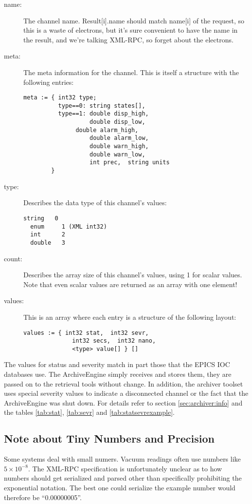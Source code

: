 \begin{description}
\item[\sffamily name:]
   The channel name.
   Result[i].name should match name[i] of the request, 
   so this is a waste of electrons,  but it's sure convenient
   to have the name in the result,  and we're talking XML-RPC,
   so forget about the electrons.
\item[\sffamily meta:]
   The meta information for the channel. This is itself a structure 
   with the following entries:
   \begin{lstlisting}[keywordstyle=\sffamily]
meta := { int32 type;
          type==0: string states[], 
          type==1: double disp_high, 
                   double disp_low, 
	           double alarm_high, 
                   double alarm_low, 
                   double warn_high, 
                   double warn_low, 
                   int prec,  string units
        }
   \end{lstlisting}
\item[\sffamily type:]
   Describes the data type of this channel's values:
  \begin{lstlisting}[frame=none, keywordstyle=\sffamily]
  string   0
  enum	   1 (XML int32)
  int      2
  double   3
  \end{lstlisting}
\item[\sffamily count:]
  Describes the array size of this channel's values,  using 1 for
  scalar values. Note that even scalar values are returned as an array
  with one element!
\item[\sffamily values:]
  This is an array where each entry is a structure of the following
  layout:
  \begin{lstlisting}[frame=none, keywordstyle=\sffamily]
  values := { int32 stat,  int32 sevr,
              int32 secs,  int32 nano,
              <type> value[] } []
  \end{lstlisting}
\end{description}

\noindent The values for status and severity match in part those that
the EPICS IOC databases use. The ArchiveEngine simply receives and
stores them, they are passed on to the retrieval tools without
change. In addition, the archiver toolset uses special severity values
to indicate a disconnected channel or the fact that the ArchiveEngine
was shut down.  For details refer to section \ref{sec:archiver:info}
and the tables \ref{tab:stat}, \ref{tab:sevr} and
\ref{tab:statsevrexample}.

\subsection{Note about Tiny Numbers and Precision} \label{sec:xml:tiny} %
Some systems deal with small numers. Vacuum readings often use numbers
like $5 \times 10^{-8}$. The XML-RPC specification is unfortunately
unclear as to how numbers should get serialized and parsed other than
specifically prohibiting the exponential notation. The best one could
serialize the example number would therefore be ``0.00000005''.

